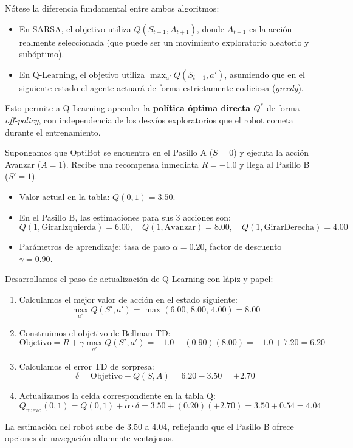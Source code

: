 \begin{ideaclave}
Nótese la diferencia fundamental entre ambos algoritmos:
\begin{itemize}
  \item En SARSA, el objetivo utiliza $Q(S_{t+1}, A_{t+1})$, donde $A_{t+1}$ es la acción realmente seleccionada (que puede ser un movimiento exploratorio aleatorio y subóptimo).
  \item En Q-Learning, el objetivo utiliza $\max_{a'} Q(S_{t+1}, a')$, asumiendo que en el siguiente estado el agente actuará de forma estrictamente codiciosa (\textit{greedy}).
\end{itemize}
Esto permite a Q-Learning aprender la \textbf{política óptima directa $Q^*$} de forma \textit{off-policy}, con independencia de los desvíos exploratorios que el robot cometa durante el entrenamiento.
\end{ideaclave}

\begin{calculomanual}
Supongamos que OptiBot se encuentra en el Pasillo A ($S=0$) y ejecuta la acción Avanzar ($A=1$). Recibe una recompensa inmediata $R = -1.0$ y llega al Pasillo B ($S'=1$).
\begin{itemize}
  \item Valor actual en la tabla: $Q(0, 1) = 3.50$.
  \item En el Pasillo B, las estimaciones para sus 3 acciones son:
  \[
    Q(1, \text{GirarIzquierda}) = 6.00, \quad Q(1, \text{Avanzar}) = 8.00, \quad Q(1, \text{GirarDerecha}) = 4.00
  \]
  \item Parámetros de aprendizaje: tasa de paso $\alpha = 0.20$, factor de descuento $\gamma = 0.90$.
\end{itemize}
Desarrollamos el paso de actualización de Q-Learning con lápiz y papel:
\begin{enumerate}
  \item Calculamos el mejor valor de acción en el estado siguiente:
  \[
    \max_{a'} Q(S', a') = \max(6.00, \, 8.00, \, 4.00) = \mathbf{8.00}
  \]
  \item Construimos el objetivo de Bellman TD:
  \[
    \text{Objetivo} = R + \gamma \max_{a'} Q(S', a') = -1.0 + (0.90)(8.00) = -1.0 + 7.20 = \mathbf{6.20}
  \]
  \item Calculamos el error TD de sorpresa:
  \[
    \delta = \text{Objetivo} - Q(S, A) = 6.20 - 3.50 = \mathbf{+2.70}
  \]
  \item Actualizamos la celda correspondiente en la tabla Q:
  \[
    Q_{\text{nuevo}}(0, 1) = Q(0, 1) + \alpha \cdot \delta = 3.50 + (0.20)(+2.70) = 3.50 + 0.54 = \mathbf{4.04}
  \]
\end{enumerate}
La estimación del robot sube de $3.50$ a $4.04$, reflejando que el Pasillo B ofrece opciones de navegación altamente ventajosas.
\end{calculomanual}

